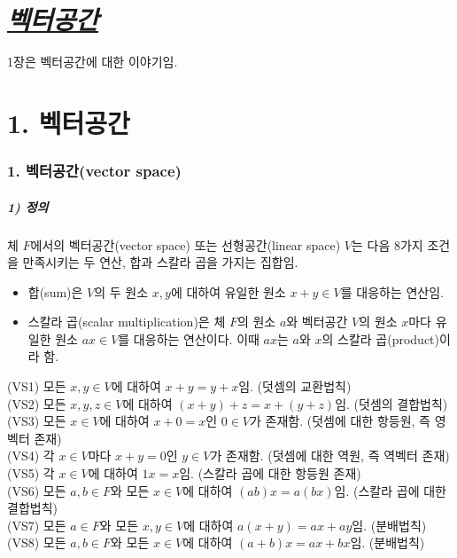 \part{\textit{\underline{벡터공간}}}

1장은 벡터공간에 대한 이야기임.

\part*{1. 벡터공간}

\section*{1. 벡터공간(vector space)}

\subsubsection*{1) 정의\\}
\begin{DEF}
체 $F$에서의 벡터공간(vector space) 또는 선형공간(linear space) $V$는 다음 8가지 조건을 만족시키는 두 연산, 합과 스칼라 곱을 가지는 집합임.

\begin{itemize}
\item 합(sum)은 $V$의 두 원소 $x, y$에 대하여 유일한 원소 $x+y \in V$를 대응하는 연산임.
\item 스칼라 곱(scalar multiplication)은 체 $F$의 원소 $a$와 벡터공간 $V$의 원소 $x$마다 유일한 원소 $ax \in V$를 대응하는 연산이다. 이때 $ax$는 $a$와 $x$의 스칼라 곱(product)이라 함.
\end{itemize}

(VS1) 모든 $x,y \in V$에 대하여 $x+y=y+x$임. (덧셈의 교환법칙)\\
(VS2) 모든 $x,y,z \in V$에 대하여 $(x+y)+z=x+(y+z)$임. (덧셈의 결합법칙)\\
(VS3) 모든 $x \in V$에 대하여 $x+0=x$인 $0 \in V$가 존재함. (덧셈에 대한 항등원, 즉 영벡터 존재)\\
(VS4) 각 $x \in V$마다 $x+y=0$인 $y \in V$가 존재함. (덧셈에 대한 역원, 즉 역벡터 존재)\\
(VS5) 각 $x \in V$에 대하여 $1x=x$임. (스칼라 곱에 대한 항등원 존재)\\
(VS6) 모든 $a,b \in F$와 모든 $x \in V$에 대하여 $(ab)x=a(bx)$임. (스칼라 곱에 대한 결합법칙)\\
(VS7) 모든 $a \in F$와 모든 $x,y \in V$에 대하여 $a(x+y)=ax+ay$임. (분배법칙)\\
(VS8) 모든 $a,b \in F$와 모든 $x \in V$에 대하여 $(a+b)x=ax+bx$임. (분배법칙)
\end{DEF}

